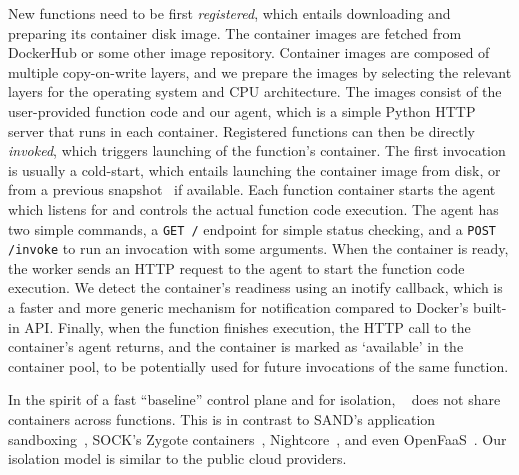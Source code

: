 New functions need to be first \emph{registered}, which entails downloading and preparing its container disk image.
The container images are fetched from DockerHub or some other image repository.
Container images are composed of multiple copy-on-write layers, and we prepare the images by selecting the relevant layers for the operating system and CPU architecture.
The images consist of the user-provided function code and our agent, which is a simple Python HTTP server that runs in each container. 
%
Registered functions can then be directly \emph{invoked}, which triggers launching of the function's container.
The first invocation is usually a cold-start, which entails launching the container image from disk, or from a previous snapshot~\cite{ustiugov2021benchmarking, ao2022faasnap} if available. 
Each function container starts the agent which listens for and controls the actual function code execution. 
The agent has two simple commands, a \texttt{GET /} endpoint for simple status checking, and a \texttt{POST /invoke} to run an invocation with some arguments.
When the container is ready, the worker sends an HTTP request to the agent to start the function code execution. 
We detect the container's readiness using an inotify callback, which is a faster and more generic mechanism for notification compared to Docker's built-in API. 
%
Finally, when the function finishes execution, the HTTP call to the container's agent returns, and the container is marked as  `available' in the container pool, to be potentially used for future invocations of the same function.

In the spirit of a fast ``baseline'' control plane and for isolation, \sysname~ does not share containers across functions.
This is in contrast to SAND's application sandboxing~\cite{akkus_sand_2018}, SOCK's Zygote containers~\cite{oakes_sock_2018}, Nightcore~\cite{jia2021nightcore}, and even OpenFaaS~\cite{openfaas}.
Our isolation model is similar to the public cloud providers. 

